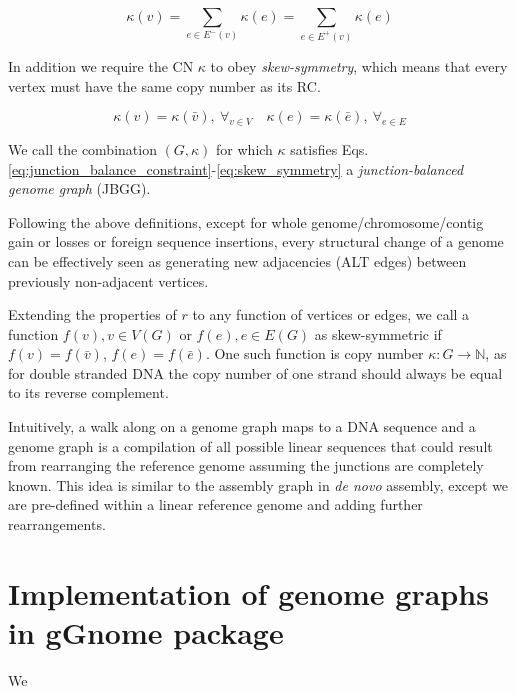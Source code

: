 \documentclass[phd,tocprelim]{cornell}
\begin{document}
\begin{equation}
    \label{eq:junction_balance_constraint}
\kappa(v)= \sum_{e\in E^-(v)} \kappa(e) = \sum_{e\in E^+(v)} \kappa(e)
\end{equation}

In addition we require the CN $\kappa$ to obey \textit{skew-symmetry}, which means that every vertex must have the same copy number as its RC.

\begin{equation}
    \label{eq:skew_symmetry}
\kappa(v) = \kappa(\bar{v}),\ \forall_{v \in V} \quad \kappa(e) = \kappa(\bar{e}),\ \forall_{e \in E} 
\end{equation}

We call the combination $(G,\kappa)$ for which $\kappa$ satisfies Eqs. \ref{eq:junction_balance_constraint}-\ref{eq:skew_symmetry} a \textit{junction-balanced genome graph} (JBGG).

% 
Following the above definitions, except for whole genome/chromosome/contig gain or losses or foreign sequence insertions, every structural change of a genome can be effectively seen as generating new adjacencies (ALT edges) between previously non-adjacent vertices.


Extending the properties of $r$ to any function of vertices or edges, we call a function $f(v), v \in V(G)$ or $f(e), e \in E(G)$ as skew-symmetric if $f(v) = f(\bar{v})$, $f(e)=f(\bar{e})$. One such function is copy number $\kappa : G \rightarrow \mathbb{N}$, as for double stranded DNA the copy number of one strand should always be equal to its reverse complement.

Intuitively, a walk along on a genome graph maps to a DNA sequence and a genome graph is a compilation of all possible linear sequences that could result from rearranging the reference genome assuming the junctions are completely known. This idea is similar to the assembly graph in \textit{de novo} assembly, except we are pre-defined within a linear reference genome and adding further rearrangements.

\section{Implementation of genome graphs in gGnome package}
We 
\end{document}

